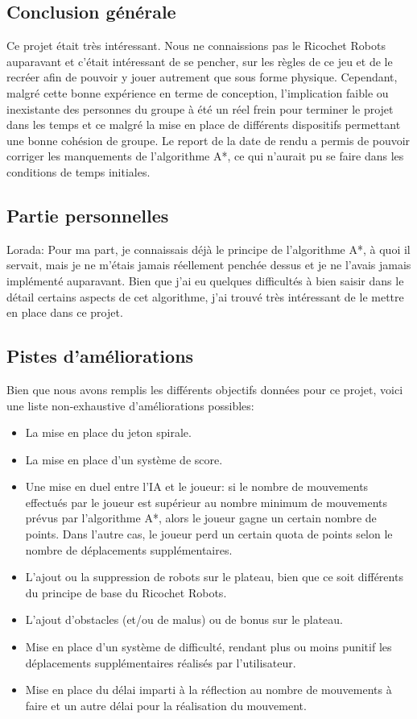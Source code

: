 \documentclass[a4paper, 12pt]{article}
\begin{document}
    \subsection{Conclusion générale}
        Ce projet était très intéressant. Nous ne connaissions pas le Ricochet Robots auparavant et c'était intéressant de se pencher, sur les règles de ce jeu et de le recréer afin de pouvoir y jouer autrement que sous forme physique. Cependant, malgré cette bonne expérience en terme de conception, l'implication faible ou inexistante des personnes du groupe à été un réel frein pour terminer le projet dans les temps et ce malgré la mise en place de différents dispositifs permettant une bonne cohésion de groupe. Le report de la date de rendu a permis de pouvoir corriger les manquements de l'algorithme A*, ce qui n'aurait pu se faire dans les conditions de temps initiales.
    \subsection{Partie personnelles}
        Lorada: Pour ma part, je connaissais déjà le principe de l'algorithme A*, à quoi il servait, mais je ne m'étais jamais réellement penchée dessus et je ne l'avais jamais implémenté auparavant. Bien que j'ai eu quelques difficultés à bien saisir dans le détail certains aspects de cet algorithme, j'ai trouvé très intéressant de le mettre en place dans ce projet.
        
    \subsection{Pistes d'améliorations}
        Bien que nous avons remplis les différents objectifs données pour ce projet, voici une liste non-exhaustive d'améliorations possibles:
        \begin{itemize}
            \item La mise en place du jeton spirale. 
            \item La mise en place d'un système de score.
            \item Une mise en duel entre l'IA et le joueur: si le nombre de mouvements effectués par le joueur est supérieur au nombre minimum de mouvements prévus par l'algorithme A*, alors le joueur gagne un certain nombre de points. Dans l'autre cas, le joueur perd un certain quota de points selon le nombre de déplacements supplémentaires.
            \item L'ajout ou la suppression de robots sur le plateau, bien que ce soit différents du principe de base du Ricochet Robots.
            \item L'ajout d'obstacles (et/ou de malus) ou de bonus sur le plateau. 
            \item Mise en place d'un système de difficulté, rendant plus ou moins punitif les déplacements supplémentaires réalisés par l'utilisateur.
            \item Mise en place du délai imparti à la réflection au nombre de mouvements à faire et un autre délai pour la réalisation du mouvement.
        \end{itemize}
    
\newpage %



\end{document}
